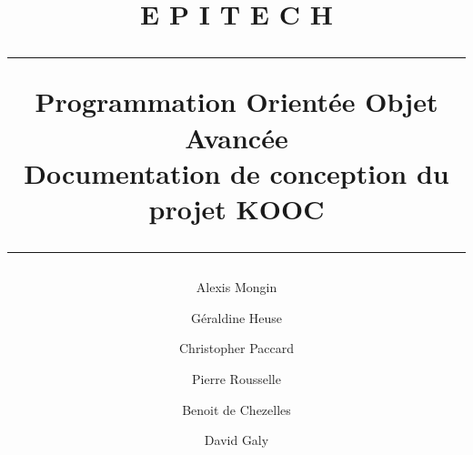 \documentclass[12pt,a4paper]{article}
\begin{document}
\title{\Huge{E P I T E C H}\\[2cm]
  \vspace{3pt}\hrule\vspace{6pt}
  Programmation Orientée Objet Avancée \\
  \Large Documentation de conception du projet KOOC
  \vspace{3pt}\hrule\vspace{1.5cm}
}

\author{Alexis Mongin \\
  \and
  Géraldine Heuse\\
  \and
  Christopher Paccard\\
  \and
  Pierre Rousselle\\
  \and
  Benoit de Chezelles\\
  \and
  David Galy\\[12cm]}

\maketitle
\newpage
\end{document}
